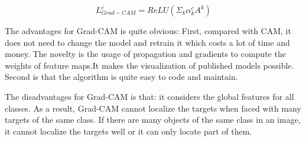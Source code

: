 \documentclass[conference]{IEEEtran}
\begin{document}
	$$L_{Grad-CAM}^{c}=ReLU(\Sigma_{k}\alpha_{k}^{c}A^{k})$$
	
	The advantages for Grad-CAM is quite obvious: First, compared with CAM, it does not need to change the model and retrain it which costs a lot of time and money. 
	The novelty is the usage of propagation and gradients to compute the weights of feature maps.It makes the visualization of published models possible. Second is that the algorithm is quite easy to code and maintain.\par
	The disadvantages for Grad-CAM is that: it considers the global features for all classes. As a result, Grad-CAM cannot localize the targets when faced with many targets of the same class. If there are many objects of the same class in an image, it cannot localize the targets well or it can only locate part of them.
	
\end{document}
